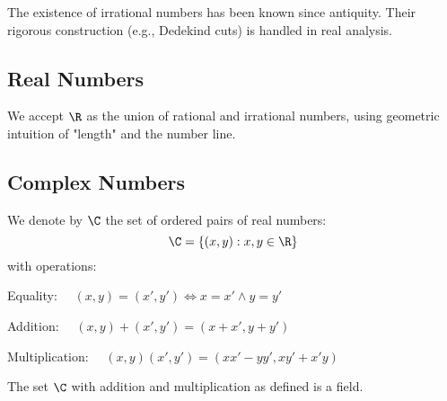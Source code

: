 \begin{note}
    The existence of irrational numbers has been known since antiquity. Their rigorous construction (e.g., Dedekind cuts) is handled in real analysis.
\end{note}

\subsection{Real Numbers}

\begin{definition*}\label{def:reals}
    We accept $\R$ as the union of rational and irrational numbers, using geometric intuition of "length" and the number line.
\end{definition*}

\subsection{Complex Numbers}

\begin{definition}\label{def:complex}
    We denote by $\C$ the set of ordered pairs of real numbers:
    \[
        \C = \{(x,y) : x, y \in \R\}
    \]
    with operations:

    Equality: $\quad (x,y) = (x',y') \iff x = x' \land y = y'$

    Addition: $\quad (x,y) + (x',y') = (x+x', y+y')$

    Multiplication: $\quad (x,y)(x',y') = (xx'-yy', xy'+x'y)$
\end{definition}

\begin{proposition}\label{prop:complex-field}
    The set $\C$ with addition and multiplication as defined is a field.
\end{proposition}

